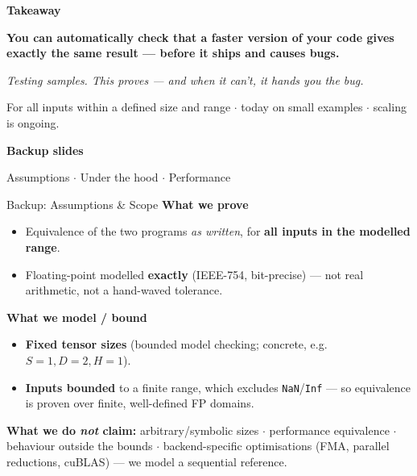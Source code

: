 \documentclass[aspectratio=169,11pt]{beamer}
\begin{document}
{
\begin{frame}[plain]
  \centering
  \vfill
  {\Large\textcolor{accent}{\textbf{Takeaway}}}

  \bigskip
  \textbf{You can automatically check that a faster version of your code gives exactly
  the same result --- before it ships and causes bugs.}

  \bigskip
  \emph{Testing samples. This proves --- and when it can't, it hands you the bug.}

  \bigskip
  {\small For all inputs within a defined size and range $\cdot$ today on small examples $\cdot$ scaling is ongoing.}
  \vfill
\end{frame}}

\appendix

{
\begin{frame}[plain]
  \centering\vfill
  {\Large\textcolor{accent}{\textbf{Backup slides}}}

  \medskip
  {\normalsize Assumptions $\cdot$ Under the hood $\cdot$ Performance}
  \vfill
\end{frame}}

\begin{frame}{Backup: Assumptions \& Scope}
  \textbf{What we prove}
  \begin{itemize}
    \item Equivalence of the two programs \emph{as written}, for \textbf{all inputs in the modelled range}.
    \item Floating-point modelled \textbf{exactly} (IEEE-754, bit-precise) --- not real arithmetic,
      not a hand-waved tolerance.
  \end{itemize}

  \textbf{What we model / bound}
  \begin{itemize}
    \item \textbf{Fixed tensor sizes} (bounded model checking; concrete, e.g. $S{=}1, D{=}2, H{=}1$).
    \item \textbf{Inputs bounded} to a finite range, which excludes \texttt{NaN}/\texttt{Inf}
      --- so equivalence is proven over finite, well-defined FP domains.
  \end{itemize}

  \textbf{What we do \emph{not} claim:} arbitrary/symbolic sizes $\cdot$ performance equivalence
  $\cdot$ behaviour outside the bounds $\cdot$ backend-specific optimisations (FMA, parallel
  reductions, cuBLAS) --- we model a sequential reference.
\end{frame}
\end{document}
